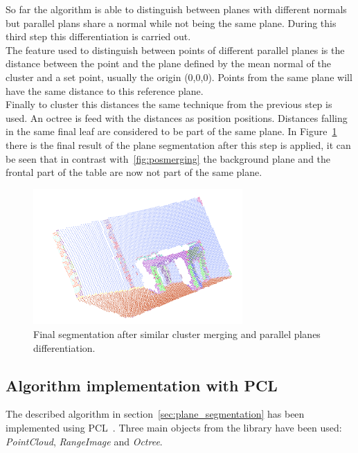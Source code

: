 \documentclass[fontsize=12pt]{article}
\begin{document}
So far the algorithm is  able to distinguish between planes with different normals but parallel plans share a normal while not being the same plane. During this third step this differentiation is carried out.\\


The feature used to distinguish between points of different parallel planes is the distance between the point and the plane defined by the mean normal of the cluster and a set point, usually the origin (0,0,0). Points from the same plane will have the same distance to this reference plane.\\

Finally to cluster this distances the same technique from the previous step is used. An octree is feed with the distances as position positions. Distances falling in the same final leaf are considered to be part of the same plane. In Figure~\ref{fig:final_segmentation} there is the final result of the plane segmentation after this step is applied, it can be seen that in contrast with~\ref{fig:posmerging} the background plane and the frontal part of the table are now not part of the same plane.\\

\begin{figure}[!htbp]
  \begin{center}
    \includegraphics[width=8cm]{./images/finalSegmentation.png}
    \caption{Final segmentation after similar cluster merging and parallel planes differentiation.}
    \label{fig:final_segmentation}
  \end{center}
\end{figure}


\subsection{Algorithm implementation with PCL}
\label{sub:algorithm_implementation_with_pcl}

The described algorithm in section~\ref{sec:plane_segmentation} has been implemented using PCL~\cite{bib:pcl}. Three main objects from the library have been used: \textit{PointCloud}, \textit{RangeImage} and \textit{Octree}.\\
\end{document}
